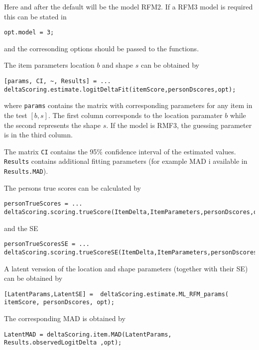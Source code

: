 \documentclass[12pt]{article}
\begin{document}
Here and after the default will be the model RFM2. If a RFM3 model is required this can be stated in 

\begin{lstlisting}[style=Matlab-bw]
opt.model = 3;
\end{lstlisting}

and the corresonding options should be passed to the functions.

The item parameters location $b$ and shape $s$ can be obtained by

\begin{lstlisting}[style=Matlab-bw]
[params, CI, ~, Results] = ...
deltaScoring.estimate.logitDeltaFit(itemScore,personDscores,opt);
\end{lstlisting}

where {\tt params} contains the matrix with corresponding parameters for any item in the test $[b,s]$. The first column corresponds to the location paramater  $b$ while the second represents the shape $s$. If the model is RMF3, the guessing parameter is in the third column.

The matrix {\tt CI} contains the 95\% confidence interval of the estimated values. {\tt Results} contains additional fitting parameters (for example MAD i available in {\tt Results.MAD}).

The persons true scores can be calculated by
\begin{lstlisting}[style=Matlab-bw]
personTrueScores = ...
deltaScoring.scoring.trueScore(ItemDelta,ItemParameters,personDscores,opt);
\end{lstlisting}

and the SE 

\begin{lstlisting}[style=Matlab-bw]
personTrueScoresSE = ...
deltaScoring.scoring.trueScoreSE(ItemDelta,ItemParameters,personDscores,opt);
\end{lstlisting}


A latent verssion of the location and shape parameters (together with their SE) can be obtained by 
\begin{lstlisting}[style=Matlab-bw]
[LatentParams,LatentSE] =  deltaScoring.estimate.ML_RFM_params( itemScore, personDscores, opt);
\end{lstlisting}

The corresponding MAD is obtained by
\begin{lstlisting}[style=Matlab-bw]
LatentMAD = deltaScoring.item.MAD(LatentParams, Results.observedLogitDelta ,opt);
\end{lstlisting}
\end{document}
